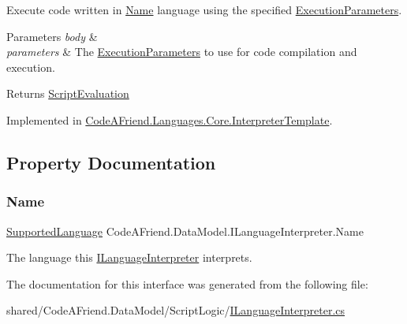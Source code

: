 Execute code written in \mbox{\hyperlink{interface_code_a_friend_1_1_data_model_1_1_i_language_interpreter_ab8d4ee55278929fb59f3f015789aaa36}{Name}} language using the specified \mbox{\hyperlink{class_code_a_friend_1_1_data_model_1_1_execution_parameters}{Execution\+Parameters}}. 


\begin{DoxyParams}{Parameters}
{\em body} & \\
\hline
{\em parameters} & The \mbox{\hyperlink{class_code_a_friend_1_1_data_model_1_1_execution_parameters}{Execution\+Parameters}} to use for code compilation and execution.\\
\hline
\end{DoxyParams}
\begin{DoxyReturn}{Returns}
\mbox{\hyperlink{class_code_a_friend_1_1_data_model_1_1_script_evaluation}{Script\+Evaluation}}
\end{DoxyReturn}


Implemented in \mbox{\hyperlink{class_code_a_friend_1_1_languages_1_1_core_1_1_interpreter_template_ae2cf761e61f7b6b6fc553703ea3ba3c5}{Code\+A\+Friend.\+Languages.\+Core.\+Interpreter\+Template}}.



\subsection{Property Documentation}
\mbox{\label{interface_code_a_friend_1_1_data_model_1_1_i_language_interpreter_ab8d4ee55278929fb59f3f015789aaa36}} 
\subsubsection{\texorpdfstring{Name}{Name}}
{\footnotesize\ttfamily \mbox{\hyperlink{namespace_code_a_friend_1_1_data_model_a13e088c525db1b03a4de75420ced79b2}{Supported\+Language}} Code\+A\+Friend.\+Data\+Model.\+I\+Language\+Interpreter.\+Name\hspace{0.3cm}{\ttfamily [get]}}



The language this \mbox{\hyperlink{interface_code_a_friend_1_1_data_model_1_1_i_language_interpreter}{I\+Language\+Interpreter}} interprets. 



The documentation for this interface was generated from the following file\+:\begin{DoxyCompactItemize}
\item 
shared/\+Code\+A\+Friend.\+Data\+Model/\+Script\+Logic/\mbox{\hyperlink{_i_language_interpreter_8cs}{I\+Language\+Interpreter.\+cs}}\end{DoxyCompactItemize}

